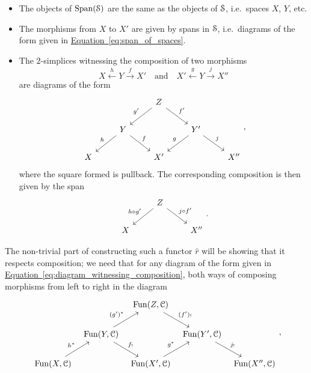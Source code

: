 \documentclass[main.tex]{subfiles}
\begin{document}
\begin{itemize}
  \item The objects of $\Span(\S)$ are the same as the objects of $\S$, i.e.\ spaces $X$, $Y$, etc.

  \item The morphisms from $X$ to $X'$ are given by spans in $\S$, i.e.\ diagrams of the form given in \hyperref[eq:span_of_spaces]{Equation~\ref*{eq:span_of_spaces}}.

  \item The $2$-simplices witnessing the composition of two morphisms 
    \begin{equation*}
      X \overset{h}{\leftarrow} Y \overset{f}{\rightarrow} X' \quad\text{and}\quad X' \overset{g}{\leftarrow} Y \overset{j}{\rightarrow} X''
    \end{equation*}
    are diagrams of the form
    \begin{equation}
      \label{eq:diagram_witnessing_composition}
      \begin{tikzcd}
        && Z
        \arrow[dl, swap, "g'"]
        \arrow[dr, "f'"]
        \\
        & Y
        \arrow[dl, swap, "h"]
        \arrow[dr, "f"]
        && Y'
        \arrow[dl, swap, "g"]
        \arrow[dr, "j"]
        \\
        X
        && X'
        && X''
      \end{tikzcd},
    \end{equation}
    where the square formed is pullback. The corresponding composition is then given by the span
    \begin{equation*}
      \begin{tikzcd}
        & Z
        \arrow[dl, swap, "h \circ g'"]
        \arrow[dr, "j \circ f'"]
        \\
        X
        && X''
      \end{tikzcd}.
    \end{equation*}
\end{itemize}
The non-trivial part of constructing such a functor $\hat{r}$ will be showing that it respects composition; we need that for any diagram of the form given in \hyperref[eq:diagram_witnessing_composition]{Equation~\ref*{eq:diagram_witnessing_composition}}, both ways of composing morphisms from left to right in the diagram
\begin{equation*}
  \begin{tikzcd}[column sep=tiny]
    && \Fun(Z, \category{C})
    \arrow[dr, "(f')_{!}"]
    \\
    & \Fun(Y, \category{C})
    \arrow[ur, "(g')^{*}"]
    \arrow[dr, "f_{!}"]
    && \Fun(Y', \category{C})
    \arrow[dr, "j_{!}"]
    \\
    \Fun(X, \category{C})
    \arrow[ur, "h^{*}"]
    && \Fun(X', \category{C})
    \arrow[ur, "g^{*}"]
    && \Fun(X'', \category{C})
  \end{tikzcd},
\end{equation*}
\end{document}
